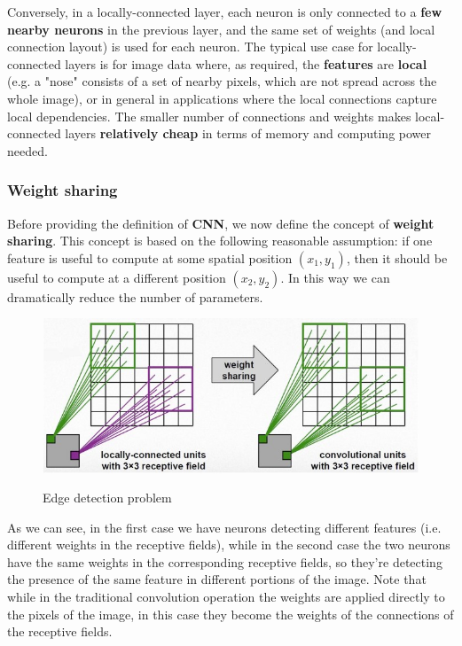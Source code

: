 Conversely, in a locally-connected layer, each neuron is only connected to a \textbf{few nearby neurons} in the previous layer, and the same set of weights (and local connection layout) is used for each neuron. The typical use case for locally-connected layers is for image data where, as required, the \textbf{features} are \textbf{local} (e.g. a "nose" consists of a set of nearby pixels, which are not spread across the whole image), or in general in applications where the local connections capture local dependencies. The smaller number of connections and weights makes local-connected layers \textbf{relatively cheap} in terms of memory and computing power needed.

\subsubsection{Weight sharing}

Before providing the definition of \textbf{CNN}, we now define the concept of \textbf{weight sharing}. This concept is based on the following reasonable assumption: if one feature is useful to compute at some spatial position $(x_1, y_1)$, then it should be useful to compute at a different position $(x_2, y_2)$. In this way we can dramatically reduce the number of parameters.

\begin{figure}[h!]
		\centering
        \includegraphics[scale = 1.5]{img/weight sharing.jpg}
		\label{mi}
        \caption{Edge detection problem}
\end{figure}

As we can see, in the first case we have neurons detecting different features (i.e. different weights in the receptive fields), while in the second case the two neurons have the same weights in the corresponding receptive fields, so they're detecting the presence of the same feature in different portions of the image. Note that while in the traditional convolution operation the weights are applied directly to the pixels of the image, in this case they become the weights of the connections of the receptive fields. 

